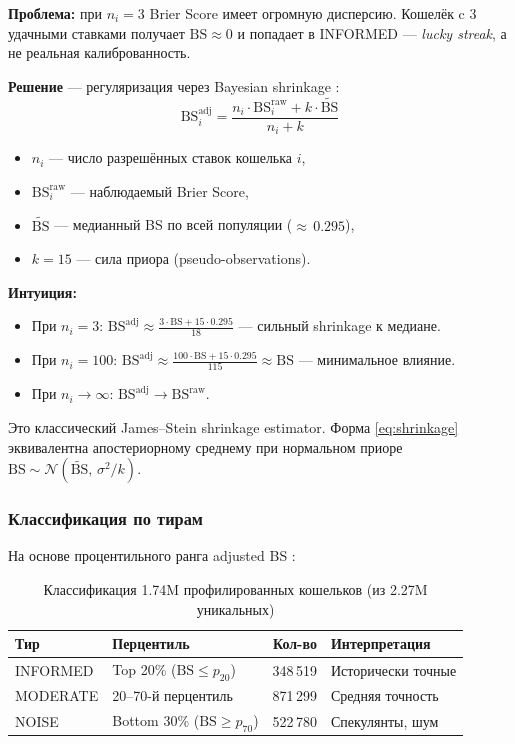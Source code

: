 \documentclass[a4paper, 11pt]{article}
\newcommand{\bs}{\mathrm{BS}}
\begin{document}
\textbf{Проблема:} при $n_i = 3$ Brier Score имеет огромную дисперсию.
Кошелёк c 3 удачными ставками получает $\bs \approx 0$ и попадает в INFORMED --- \emph{lucky streak},
а не реальная калиброванность.

\textbf{Решение} --- регуляризация через Bayesian shrinkage \citep{ferro2012sampling}:
\begin{equation}
\label{eq:shrinkage}
\boxed{
\bs_i^{\mathrm{adj}} = \frac{n_i \cdot \bs_i^{\mathrm{raw}} + k \cdot \widetilde{\bs}}{n_i + k}
}
\end{equation}

\begin{itemize}[nosep]
  \item $n_i$ --- число разрешённых ставок кошелька $i$,
  \item $\bs_i^{\mathrm{raw}}$ --- наблюдаемый Brier Score,
  \item $\widetilde{\bs}$ --- медианный BS по всей популяции (${\approx}\,0.295$),
  \item $k = 15$ --- сила приора (pseudo-observations).
\end{itemize}

\textbf{Интуиция:}
\begin{itemize}[nosep]
  \item При $n_i = 3$: $\bs^{\mathrm{adj}} \approx \frac{3 \cdot \bs + 15 \cdot 0.295}{18}$ ---
    сильный shrinkage к медиане.
  \item При $n_i = 100$: $\bs^{\mathrm{adj}} \approx \frac{100 \cdot \bs + 15 \cdot 0.295}{115} \approx \bs$ ---
    минимальное влияние.
  \item При $n_i \to \infty$: $\bs^{\mathrm{adj}} \to \bs^{\mathrm{raw}}$.
\end{itemize}

Это классический James--Stein shrinkage estimator.
Форма \eqref{eq:shrinkage} эквивалентна апостериорному среднему
при нормальном приоре $\bs \sim \mathcal{N}(\widetilde{\bs},\, \sigma^2/k)$.

\subsubsection{Классификация по тирам}

На основе процентильного ранга adjusted BS
\citep{akey2025polymarket,mitts2026informed}:

\begin{table}[h]
\centering
\begin{tabular}{llrl}
\toprule
\textbf{Тир} & \textbf{Перцентиль} & \textbf{Кол-во} & \textbf{Интерпретация} \\
\midrule
INFORMED  & Top 20\% ($\bs \leq p_{20}$)        & 348\,519 & Исторически точные \\
MODERATE  & 20--70-й перцентиль                   & 871\,299 & Средняя точность \\
NOISE     & Bottom 30\% ($\bs \geq p_{70}$)       & 522\,780 & Спекулянты, шум \\
\bottomrule
\end{tabular}
\caption{Классификация 1.74M профилированных кошельков (из 2.27M уникальных)}
\label{tab:tiers}
\end{table}
\end{document}
